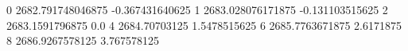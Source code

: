0 2682.791748046875 -0.367431640625
1 2683.028076171875 -0.131103515625
2 2683.1591796875 0.0
4 2684.70703125 1.5478515625
6 2685.7763671875 2.6171875
8 2686.9267578125 3.767578125
